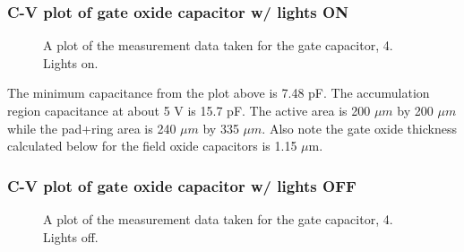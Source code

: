 \documentclass{article}
\begin{document}
\subsubsection{C-V plot of gate oxide capacitor w/ lights ON}
\begin{figure}[H]
\centering
{}
\caption{A plot of the measurement data taken for the gate capacitor, 4. Lights on.}
\end{figure}

The minimum capacitance from the plot above is 7.48 pF. The accumulation region capacitance at about 5 V is 15.7 pF. The active area is 200 $\mu m$ by 200 $\mu m$ while the pad+ring area is 240 $\mu m$ by 335 $\mu m$. Also note the gate oxide thickness calculated below for the field oxide capacitors is 1.15 $\mu$m.

\subsubsection{C-V plot of gate oxide capacitor w/ lights OFF}
\begin{figure}[H]
\centering
{}
\caption{A plot of the measurement data taken for the gate capacitor, 4. Lights off.}
\end{figure}
\end{document}
